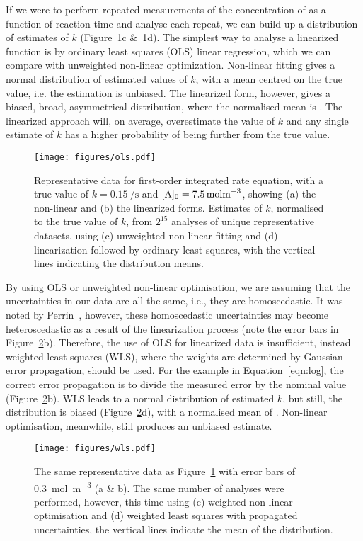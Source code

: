 \documentclass[journal=jceda8,manuscript=article]{achemso}
\begin{document}
If we were to perform repeated measurements of the concentration of  as a function of reaction time and analyse each repeat, we can build up a distribution of estimates of $k$ (Figure~\ref{fig:ols}c \&~\ref{fig:ols}d). 
The simplest way to analyse a linearized function is by ordinary least squares (OLS) linear regression, which we can compare with unweighted non-linear optimization. 
Non-linear fitting gives a normal distribution of estimated values of $k$, with a mean centred on the true value, i.e. the estimation is unbiased. 
The linearized form, however, gives a biased, broad, asymmetrical distribution, where the normalised mean is .
The linearized approach will, on average, overestimate the value of $k$ and any single estimate of $k$ has a higher probability of being further from the true value. 
%
\begin{figure}
  \texttt{[image: figures/ols.pdf]}
  \caption{
    Representative data for first-order integrated rate equation, with a true value of $k=\SI{0.15}{\per\second}$ and $[\ce{A}]_0=\SI{7.5}{\mol\m^{-3}}$, showing (a) the non-linear and (b) the linearized forms. 
    Estimates of $k$, normalised to the true value of $k$, from $2^{15}$ analyses of unique representative datasets, using (c) unweighted non-linear fitting and (d) linearization followed by ordinary least squares, with the vertical lines indicating the distribution means.
    }
  \label{fig:ols}
\end{figure}
%

By using OLS or unweighted non-linear optimisation, we are assuming that the uncertainties in our data are all the same, i.e., they are homoscedastic. 
It was noted by Perrin~\cite{perrin_linear_2017}, however, these homoscedastic uncertainties may become heteroscedastic as a result of the linearization process (note the error bars in Figure~\ref{fig:wls}b). 
Therefore, the use of OLS for linearized data is insufficient, instead weighted least squares (WLS), where the weights are determined by Gaussian error propagation, should be used.
For the example in Equation~\ref{eqn:log}, the correct error propagation is to divide the measured error by the nominal value (Figure~\ref{fig:wls}b).
WLS leads to a normal distribution of estimated $k$, but still, the distribution is biased (Figure~\ref{fig:wls}d), with a normalised mean of .
Non-linear optimisation, meanwhile, still produces an unbiased estimate.
%
\begin{figure}
  \texttt{[image: figures/wls.pdf]}
  \caption{
    The same representative data as Figure~\ref{fig:ols} with error bars of \SI{0.3}{{\mol\m^{-3}}} (a \& b).
    The same number of analyses were performed, however, this time using (c) weighted non-linear optimisation and (d) weighted least squares with propagated uncertainties, the vertical lines indicate the mean of the distribution. 
    }
  \label{fig:wls}
\end{figure}
%
\end{document}
